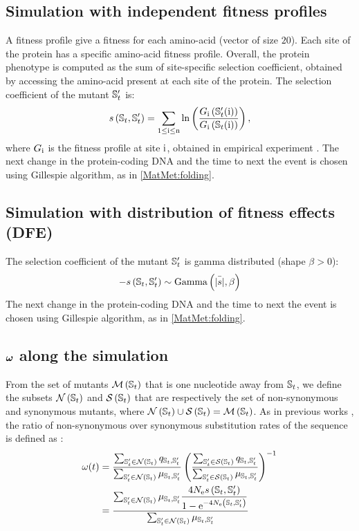 \documentclass{article}
\begin{document}
\subsection*{Simulation with independent fitness profiles}
A fitness profile give a fitness for each amino-acid (vector of size $20$).
Each site of the protein has a specific amino-acid fitness profile.
Overall, the protein phenotype is computed as the sum of site-specific selection coefficient, obtained by accessing the amino-acid present at each site of the protein.
The selection coefficient of the mutant $\mathbb{S}_{t}'$ is:
\begin{equation}
s \left( \mathbb{S}_{t},\mathbb{S}_{t}'\right) = \sum_{1 \leq \text{i} \leq \text{n}} \ln \left( \dfrac{G_{\text{i}} \left(\mathbb{S}_{t}'(\text{i}) \right)}{G_{\text{i}} \left(\mathbb{S}_{t}(\text{i}) \right)} \right) ,
\end{equation}
where $G_{\text{i}}$ is the fitness profile at site $\text{i}$, obtained in empirical experiment \cite{Bloom2017}.
The next change in the protein-coding DNA and the time to next the event is chosen using Gillespie algorithm, as in \ref{MatMet:folding}.
\subsection*{Simulation with distribution of fitness effects (DFE)}
The selection coefficient of the mutant $\mathbb{S}_{t}'$ is gamma distributed (shape $\beta > 0$):
\begin{equation}
- s \left( \mathbb{S}_{t},\mathbb{S}_{t}'\right) \sim \text{Gamma} \left( \bar{|s|}, \beta \right)
\end{equation}
The next change in the protein-coding DNA and the time to next the event is chosen using Gillespie algorithm, as in \ref{MatMet:folding}.
\subsection*{$\bm{\omega}$ along the simulation}
From the set of mutants $\mathcal{M}\left(\mathbb{S}_{t}\right)$ that is one nucleotide away from $\mathbb{S}_{t}$, we define the subsets $\mathcal{N}\left(\mathbb{S}_{t}\right)$ and $\mathcal{S}\left(\mathbb{S}_{t}\right)$ that are respectively the set of non-synonymous and synonymous mutants, where $\mathcal{N}\left(\mathbb{S}_{t}\right) \cup \mathcal{S}\left(\mathbb{S}_{t}\right) = \mathcal{M}\left(\mathbb{S}_{t}\right)$.
As in previous works \cite{Spielman2015a, DosReis2015, Jones2016}, the ratio of non-synonymous over synonymous substitution rates of the sequence is defined as :
\begin{align}
\omega(t) &= \dfrac{\sum_{\mathbb{S}_{t}' \in \mathcal{N}\left(\mathbb{S}_{t}\right)} q_{\mathbb{S}_{t}, \mathbb{S}_{t}'}}{\sum_{\mathbb{S}_{t}' \in \mathcal{N}\left(\mathbb{S}_{t}\right)} \mu_{\mathbb{S}_{t}, \mathbb{S}_{t}'}} \left( \dfrac{\sum_{\mathbb{S}_{t}' \in \mathcal{S}\left(\mathbb{S}_{t}\right)} q_{\mathbb{S}_{t}, \mathbb{S}_{t}'}}{\sum_{\mathbb{S}_{t}' \in \mathcal{S}\left(\mathbb{S}_{t}\right)} \mu_{\mathbb{S}_{t}, \mathbb{S}_{t}'}} \right)^{-1}\\
 &= \dfrac{\sum_{\mathbb{S}_{t}' \in \mathcal{N}\left(\mathbb{S}_{t}\right)} \mu_{\mathbb{S}_{t}, \mathbb{S}_{t}'} \dfrac{4 N_{\mathrm{e}} s \left( \mathbb{S}_{t},\mathbb{S}_{t}'\right)}{{1 - \mathrm{e}^{-4 N_{\mathrm{e}} \left( \mathbb{S}_{t},\mathbb{S}_{t}'\right)} }}}{\sum_{\mathbb{S}_{t}' \in \mathcal{N}\left(\mathbb{S}_{t}\right)} \mu_{\mathbb{S}_{t}, \mathbb{S}_{t}'}} 
\end{align}
\end{document}
